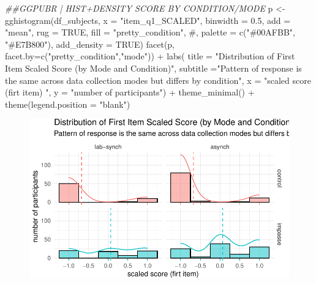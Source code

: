 \documentclass[
  letterpaper,
  DIV=11,
  numbers=noendperiod]{scrreprt}
\newenvironment{Shaded}{\begin{snugshade}}{\end{snugshade}}
\newcommand{\AttributeTok}[1]{\textcolor[rgb]{0.40,0.45,0.13}{#1}}
\newcommand{\CommentTok}[1]{\textcolor[rgb]{0.37,0.37,0.37}{#1}}
\newcommand{\ConstantTok}[1]{\textcolor[rgb]{0.56,0.35,0.01}{#1}}
\newcommand{\DocumentationTok}[1]{\textcolor[rgb]{0.37,0.37,0.37}{\textit{#1}}}
\newcommand{\FloatTok}[1]{\textcolor[rgb]{0.68,0.00,0.00}{#1}}
\newcommand{\FunctionTok}[1]{\textcolor[rgb]{0.28,0.35,0.67}{#1}}
\newcommand{\NormalTok}[1]{\textcolor[rgb]{0.00,0.23,0.31}{#1}}
\newcommand{\OtherTok}[1]{\textcolor[rgb]{0.00,0.23,0.31}{#1}}
\newcommand{\SpecialCharTok}[1]{\textcolor[rgb]{0.37,0.37,0.37}{#1}}
\newcommand{\StringTok}[1]{\textcolor[rgb]{0.13,0.47,0.30}{#1}}
\begin{document}
\begin{Shaded}
\begin{Highlighting}[]
\DocumentationTok{\#\#GGPUBR | HIST+DENSITY SCORE BY CONDITION/MODE}
\NormalTok{p }\OtherTok{\textless{}{-}} \FunctionTok{gghistogram}\NormalTok{(df\_subjects, }\AttributeTok{x =} \StringTok{"item\_q1\_SCALED"}\NormalTok{, }\AttributeTok{binwidth =} \FloatTok{0.5}\NormalTok{,}
   \AttributeTok{add =} \StringTok{"mean"}\NormalTok{, }\AttributeTok{rug =} \ConstantTok{TRUE}\NormalTok{,}
   \AttributeTok{fill =} \StringTok{"pretty\_condition"}\NormalTok{, }\CommentTok{\#, palette = c("\#00AFBB", "\#E7B800"),}
   \AttributeTok{add\_density =} \ConstantTok{TRUE}\NormalTok{) }
\FunctionTok{facet}\NormalTok{(p, }\AttributeTok{facet.by=}\FunctionTok{c}\NormalTok{(}\StringTok{"pretty\_condition"}\NormalTok{,}\StringTok{"mode"}\NormalTok{)) }\SpecialCharTok{+} 
  \FunctionTok{labs}\NormalTok{( }\AttributeTok{title =} \StringTok{"Distribution of First Item Scaled Score (by Mode and Condition)"}\NormalTok{,}
        \AttributeTok{subtitle =}\StringTok{"Pattern of response is the same across data collection modes but differs by condition"}\NormalTok{,}
        \AttributeTok{x =} \StringTok{"scaled score (firt item) "}\NormalTok{, }\AttributeTok{y =} \StringTok{"number of participants"}\NormalTok{) }\SpecialCharTok{+} 
  \FunctionTok{theme\_minimal}\NormalTok{() }\SpecialCharTok{+} \FunctionTok{theme}\NormalTok{(}\AttributeTok{legend.position =} \StringTok{"blank"}\NormalTok{) }
\end{Highlighting}
\end{Shaded}

\begin{figure}[H]

{\centering \includegraphics{analysis/SGC3A/3_sgc3A_description_files/figure-pdf/VIS-FIRST-SCALED-2.pdf}

}

\end{figure}
\end{document}
